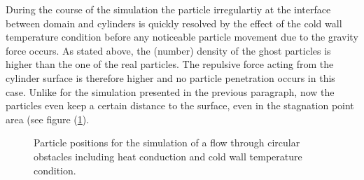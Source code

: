 \documentclass[11pt,a4paper,twoside]{report}
\begin{document}
During the course of the simulation the particle irregulartiy at the interface between domain and cylinders is quickly resolved by the effect of the cold wall temperature condition before any noticeable particle movement due to the gravity force occurs. As stated above, the (number) density of the ghost particles is higher than the one of the real particles. %
The repulsive force acting from the cylinder surface is therefore higher and no particle penetration occurs in this case. Unlike for the simulation presented in the previous paragraph, now the particles even keep a certain distance to the surface, even in the stagnation point area (see figure (\ref{fig:PorositiesResults_Pos_Hex_pseudoHex2}). 

\begin{figure}[h]

\centering
\label{fig:PorositiesResults_Pos_Hex_pseudoHex2}

\caption[Particle positions for porosities]{Particle positions for the simulation of a flow through circular obstacles including heat conduction and cold wall temperature condition.}

\end{figure}
\end{document}
